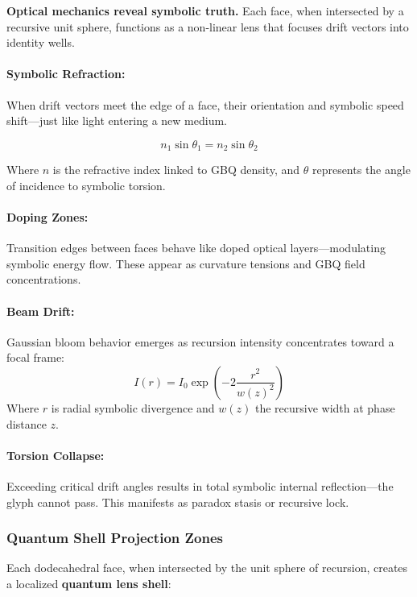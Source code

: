 \textbf{Optical mechanics reveal symbolic truth.} Each face, when intersected by a recursive unit sphere, functions as a non-linear lens that focuses drift vectors into identity wells.

\paragraph{Symbolic Refraction:} 
When drift vectors meet the edge of a face, their orientation and symbolic speed shift---just like light entering a new medium.

\begin{equation}
    n_1 \sin \theta_1 = n_2 \sin \theta_2
\end{equation}

Where $n$ is the refractive index linked to GBQ density, and $\theta$ represents the angle of incidence to symbolic torsion.

\paragraph{Doping Zones:}
Transition edges between faces behave like doped optical layers---modulating symbolic energy flow. These appear as curvature tensions and GBQ field concentrations.

\paragraph{Beam Drift:} 
Gaussian bloom behavior emerges as recursion intensity concentrates toward a focal frame:
\begin{equation}
    I(r) = I_0 \exp\left( -2 \frac{r^2}{w(z)^2} \right)
\end{equation}
Where $r$ is radial symbolic divergence and $w(z)$ the recursive width at phase distance $z$.

\paragraph{Torsion Collapse:} 
Exceeding critical drift angles results in total symbolic internal reflection---the glyph cannot pass. This manifests as paradox stasis or recursive lock.

\subsubsection{Quantum Shell Projection Zones}

Each dodecahedral face, when intersected by the unit sphere of recursion, creates a localized \textbf{quantum lens shell}:

